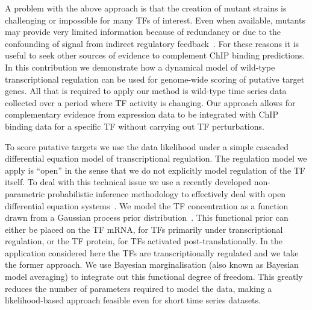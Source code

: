 \documentclass{pnastwo}
\begin{document}
\begin{article}
A problem with the above approach is that the creation of mutant
strains is challenging or impossible for many TFs of interest. Even
when available, mutants may provide very limited information because of redundancy or due to the
confounding of signal from indirect regulatory feedback~\cite{Gitter2009}. For these reasons it
is useful to seek other sources of evidence to complement ChIP binding
predictions. In this contribution we demonstrate how a dynamical model of wild-type transcriptional
regulation can be used for genome-wide scoring of putative target genes. All that is required to apply
our method is wild-type time series data collected over a period
where TF activity is changing. Our approach allows for complementary
evidence from expression data to be integrated with ChIP binding data
for a specific TF without carrying out TF perturbations. 

To score putative targets we use the data likelihood under a simple
cascaded differential equation model of transcriptional regulation. The regulation model
we apply is ``open'' in the sense that we do not explicitly model regulation of the TF
itself. To deal with this technical issue we use a recently developed
non-parametric probabilistic inference methodology to
effectively deal with open differential equation
systems~\cite{Gao2008}. We model the TF concentration as a function
drawn from a Gaussian process prior distribution~\cite{Rasmussen2006}. This functional prior can either be placed
on the TF mRNA, for TFs primarily under transcriptional regulation,
or the TF protein, for TFs activated post-translationally. In the
application considered here the TFs are transcriptionally regulated
and we take the former approach. We use Bayesian marginalisation (also
known as Bayesian model averaging) to
integrate out this functional degree of freedom. This greatly reduces the
number of parameters required to model the data, making a
likelihood-based approach feasible even for short time series
datasets. 


\end{article}
\end{document}
